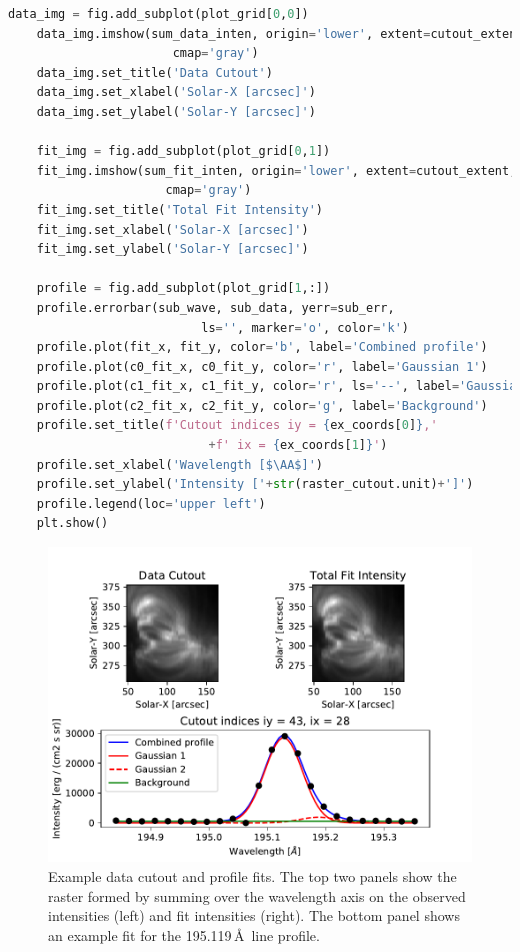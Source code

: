 \begin{lstlisting}[language=Python]
    data_img = fig.add_subplot(plot_grid[0,0])
    data_img.imshow(sum_data_inten, origin='lower', extent=cutout_extent, 
                       cmap='gray')
    data_img.set_title('Data Cutout')
    data_img.set_xlabel('Solar-X [arcsec]')
    data_img.set_ylabel('Solar-Y [arcsec]')

    fit_img = fig.add_subplot(plot_grid[0,1])
    fit_img.imshow(sum_fit_inten, origin='lower', extent=cutout_extent, 
                      cmap='gray')
    fit_img.set_title('Total Fit Intensity')
    fit_img.set_xlabel('Solar-X [arcsec]')
    fit_img.set_ylabel('Solar-Y [arcsec]')

    profile = fig.add_subplot(plot_grid[1,:])
    profile.errorbar(sub_wave, sub_data, yerr=sub_err,
                           ls='', marker='o', color='k')
    profile.plot(fit_x, fit_y, color='b', label='Combined profile')
    profile.plot(c0_fit_x, c0_fit_y, color='r', label='Gaussian 1')
    profile.plot(c1_fit_x, c1_fit_y, color='r', ls='--', label='Gaussian 2')
    profile.plot(c2_fit_x, c2_fit_y, color='g', label='Background')
    profile.set_title(f'Cutout indices iy = {ex_coords[0]},'
                            +f' ix = {ex_coords[1]}')
    profile.set_xlabel('Wavelength [$\AA$]')
    profile.set_ylabel('Intensity ['+str(raster_cutout.unit)+']')
    profile.legend(loc='upper left')
    plt.show()
\end{lstlisting}
\begin{figure}[b!]
  \centerline{\includegraphics[clip,width=\linewidth]{figures/ex_cutout_and_fit.pdf}}
  \caption{Example data cutout and profile fits. The top two panels show the raster formed by summing
    over the wavelength axis on the observed intensities (left) and fit intensities (right).
    The bottom panel shows an example fit for the  195.119\,\AA\ line profile.}
  \label{fig:fit_example}
\end{figure}